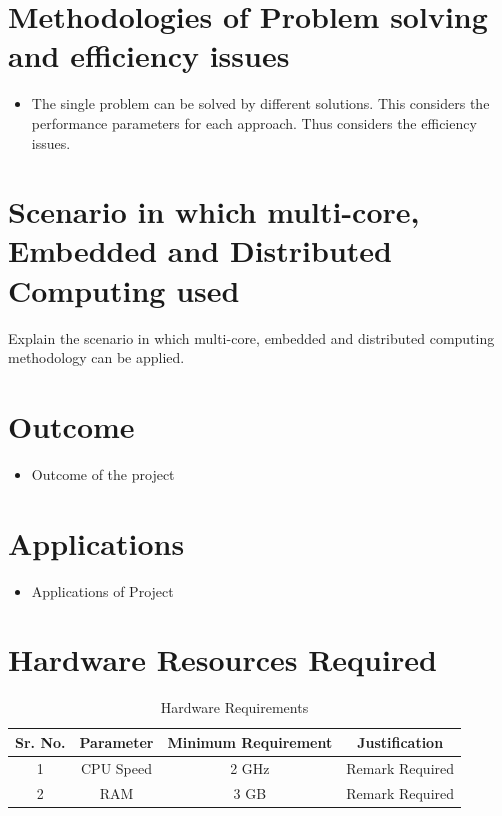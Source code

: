 \documentclass[oneside,a4paper,12pt]{report}
\begin{document}
\section{Methodologies of Problem solving and efficiency issues}
\begin{itemize}
	\item The single problem can be solved by different solutions.  This considers the performance parameters for each approach. Thus considers the efficiency issues.
\end{itemize}

\section{Scenario in which multi-core, Embedded and Distributed Computing used}
 Explain the scenario in which multi-core, embedded and distributed computing methodology can be applied.


\section{Outcome}
\begin{itemize}
\item Outcome of the project
\end{itemize}

\section{Applications}
\begin{itemize}
\item Applications of Project
\end{itemize}

\section{Hardware Resources Required}
\begin{table}[!htbp]
\begin{center}
\def\arraystretch{1.5}
  \begin{tabular}{| c | c | c | c |}
\hline
Sr. No. &	Parameter &	Minimum Requirement & Justification \\
\hline
1 &	CPU Speed &	 2 GHz  & Remark Required\\
\hline
2 &	RAM  &	3 GB &  Remark Required\\
 \hline
\end{tabular}
 \caption { Hardware Requirements }
 \label{tab:hreq}
\end{center}

\end{table}
\end{document}
